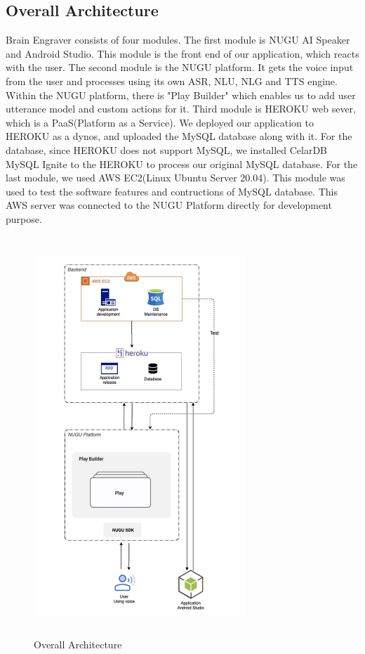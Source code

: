 \documentclass[conference]{IEEEtran}
\begin{document}
    \subsection{Overall Architecture}
Brain Engraver consists of four modules. The first module is NUGU AI Speaker and Android Studio. This module is the front end of our application, which reacts with the user. The second module is the NUGU platform. It gets the voice input from the user and processes using its own ASR, NLU, NLG and TTS engine. Within the NUGU platform, there is "Play Builder" which enables us to add user utterance model and custom actions for it. Third module is HEROKU web sever, which is a PaaS(Platform as a Service). We deployed our application to HEROKU as a dynos, and uploaded the MySQL database along with it. For the database, since HEROKU does not support MySQL, we installed CelarDB MySQL Ignite to the HEROKU to process our original MySQL database. For the last module, we used AWS EC2(Linux Ubuntu Server 20.04). This module was used to test the software features and contructions of MySQL database. This AWS server was connected to the NUGU Platform directly for development purpose.
\begin{figure}[h]
    \centering
    \hfill
    \includegraphics[width=8cm,height=15cm]{images/diagram1.jpeg}
    \hfill
    \caption{Overall Architecture}
\end{figure}
\end{document}
